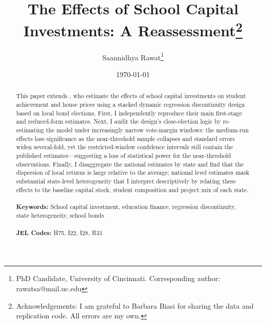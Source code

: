 \documentclass[12pt]{article}
\begin{document}
\begin{titlepage}
\title{The Effects of School Capital Investments: A Reassessment\thanks{Acknowledgements: I am grateful to Barbara Biasi for sharing the data and replication code. All errors are my own.}}
\author{Saannidhya Rawat\thanks{PhD Candidate, University of Cincinnati. Corresponding author: rawatsa@mail.uc.edu}}
\date{\today}
\maketitle

\begin{abstract}
\noindent This paper extends \citet{biasi_what_2025}, who estimate the effects of school capital investments on student achievement and house prices using a stacked dynamic regression discontinuity design based on local bond elections. First, I independently reproduce their main first-stage and reduced-form estimates. Next, I audit the design's close-election logic by re-estimating the model under increasingly narrow vote-margin windows: the medium-run effects lose significance as the near-threshold sample collapses and standard errors widen several-fold, yet the restricted-window confidence intervals still contain the published estimates---suggesting a loss of statistical power for the near-threshold observations. Finally, I disaggregate the national estimates by state and find that the dispersion of local returns is large relative to the average; national level estimates mask substantial state-level heterogeneity that I interpret descriptively by relating these effects to the baseline capital stock, student composition and project mix of each state. 
\\
\vspace{0in}\\
\noindent\textbf{Keywords:} School capital investment, education finance, regression discontinuity, state heterogeneity, school bonds\\
\vspace{0in}\\
\noindent\textbf{JEL Codes:} H75, I22, I28, R31

\bigskip
\end{abstract}
\setcounter{page}{0}
\thispagestyle{empty}
\end{titlepage}
\pagebreak \newpage
\end{document}
